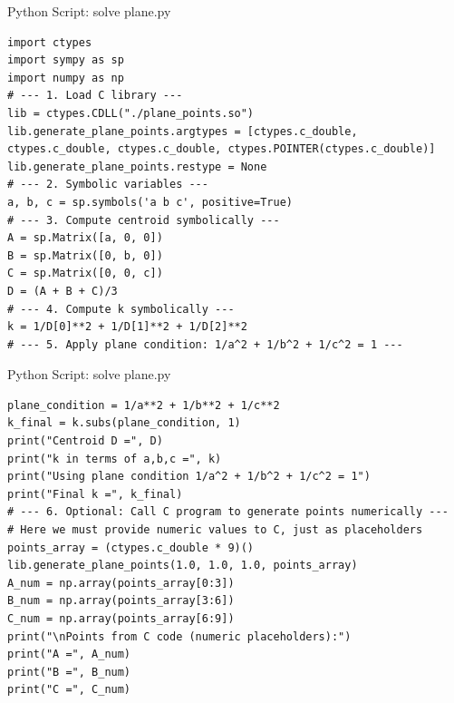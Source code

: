 \documentclass{beamer}
\numberwithin{equation}{section}
\theoremstyle{remark}
\begin{document}
\begin{frame}[fragile]{Python Script:  solve plane.py}
\begin{verbatim}
import ctypes
import sympy as sp
import numpy as np
# --- 1. Load C library ---
lib = ctypes.CDLL("./plane_points.so")
lib.generate_plane_points.argtypes = [ctypes.c_double, ctypes.c_double, ctypes.c_double, ctypes.POINTER(ctypes.c_double)]
lib.generate_plane_points.restype = None
# --- 2. Symbolic variables ---
a, b, c = sp.symbols('a b c', positive=True)
# --- 3. Compute centroid symbolically ---
A = sp.Matrix([a, 0, 0])
B = sp.Matrix([0, b, 0])
C = sp.Matrix([0, 0, c])
D = (A + B + C)/3
# --- 4. Compute k symbolically ---
k = 1/D[0]**2 + 1/D[1]**2 + 1/D[2]**2
# --- 5. Apply plane condition: 1/a^2 + 1/b^2 + 1/c^2 = 1 ---
\end{verbatim}
\end{frame}
\begin{frame}[fragile]{Python Script:  solve plane.py}
\begin{verbatim}
plane_condition = 1/a**2 + 1/b**2 + 1/c**2
k_final = k.subs(plane_condition, 1)
print("Centroid D =", D)
print("k in terms of a,b,c =", k)
print("Using plane condition 1/a^2 + 1/b^2 + 1/c^2 = 1")
print("Final k =", k_final)
# --- 6. Optional: Call C program to generate points numerically ---
# Here we must provide numeric values to C, just as placeholders
points_array = (ctypes.c_double * 9)()
lib.generate_plane_points(1.0, 1.0, 1.0, points_array)
A_num = np.array(points_array[0:3])
B_num = np.array(points_array[3:6])
C_num = np.array(points_array[6:9])
print("\nPoints from C code (numeric placeholders):")
print("A =", A_num)
print("B =", B_num)
print("C =", C_num)
\end{verbatim}
\end{frame}

\end{document}

